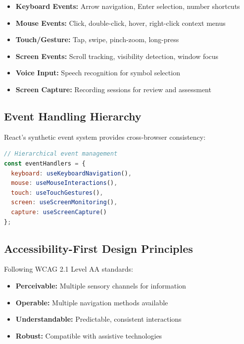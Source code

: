 \documentclass[12pt, a4paper]{article}
\begin{document}
\begin{tcolorbox}[colback=lightgray, colframe=primaryblue, title=Interaction Modalities]
\begin{itemize}[leftmargin=*]
    \item \textbf{Keyboard Events:} Arrow navigation, Enter selection, number shortcuts
    \item \textbf{Mouse Events:} Click, double-click, hover, right-click context menus
    \item \textbf{Touch/Gesture:} Tap, swipe, pinch-zoom, long-press
    \item \textbf{Screen Events:} Scroll tracking, visibility detection, window focus
    \item \textbf{Voice Input:} Speech recognition for symbol selection
    \item \textbf{Screen Capture:} Recording sessions for review and assessment
\end{itemize}
\end{tcolorbox}

\subsection{Event Handling Hierarchy}

React's synthetic event system provides cross-browser consistency:

\begin{lstlisting}[language=JavaScript, caption=Event Handler Architecture]
// Hierarchical event management
const eventHandlers = {
  keyboard: useKeyboardNavigation(),
  mouse: useMouseInteractions(),
  touch: useTouchGestures(),
  screen: useScreenMonitoring(),
  capture: useScreenCapture()
};
\end{lstlisting}

\subsection{Accessibility-First Design Principles}

Following WCAG 2.1 Level AA standards:

\begin{itemize}[leftmargin=*]
    \item \textbf{Perceivable:} Multiple sensory channels for information
    \item \textbf{Operable:} Multiple navigation methods available
    \item \textbf{Understandable:} Predictable, consistent interactions
    \item \textbf{Robust:} Compatible with assistive technologies
\end{itemize}
\end{document}
